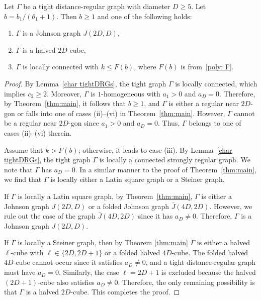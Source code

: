 \begin{theorem}\label{tight corollary}
Let $\Gamma$ be a tight distance-regular graph with diameter $D \geqslant 5$. Let $b=b_1/(\theta_1 +1)$. Then $b \geqslant 1$ and one of the following holds:
\begin{enumerate}[\normalfont(i)]
  \item $\Gamma$ is a Johnson graph $J(2D,D)$,
  \item $\Gamma$ is a halved $2D$-cube,
  \item $\Gamma$ is locally connected with $k \leqslant F(b)$, where $F(b)$ is from~\eqref{poly: F}.
\end{enumerate}
\end{theorem}
\begin{proof}
By Lemma~\ref{char tightDRGs}, the tight graph $\Gamma$ is locally connected, which implies $c_2\geqslant 2$.
Moreover, $\Gamma$ is $1$-homogeneous with $a_1 > 0$ and $a_D=0$.
Therefore, by Theorem~\ref{thm:main}, it follows that $b\geqslant 1$, and $\Gamma$ is either a regular near $2D$-gon or falls into one of cases (ii)--(vi) in Theorem~\ref{thm:main}.
However, $\Gamma$ cannot be a regular near $2D$-gon since $a_1 > 0$ and $a_D=0$.
Thus, $\Gamma$ belongs to one of cases (ii)--(vi) therein.

Assume that $k > F(b)$; otherwise, it leads to case (iii).
By Lemma~\ref{char tightDRGs}, the tight graph $\Gamma$ is locally a connected strongly regular graph.
We note that $\Gamma$ has $a_D=0$.
In a similar manner to the proof of Theorem~\ref{thm:main}, we find that $\Gamma$ is locally either a Latin square graph or a Steiner graph.

If $\Gamma$ is locally a Latin square graph, by Theorem~\ref{thm:main}, $\Gamma$ is either a Johnson graph $J(2D,D)$ or a folded Johnson graph $\bar{J}(4D,2D)$. 
However, we rule out the case of the graph $\bar{J}(4D,2D)$ since it has $a_D\ne 0$. 
Therefore, $\Gamma$ is a Johnson graph $J(2D,D)$.

If $\Gamma$ is locally a Steiner graph, then by Theorem \ref{thm:main} $\Gamma$ is either a halved $\ell$-cube with $\ell \in \{2D,2D+1\}$ or a folded halved $4D$-cube. The folded halved $4D$-cube cannot occur since it satisfies $a_D \ne 0$, and a tight distance-regular graph must have $a_D = 0$. Similarly, the case $\ell = 2D+1$ is excluded because the halved $(2D+1)$-cube also satisfies $a_D \ne 0$. Therefore, the only remaining possibility is that $\Gamma$ is a halved $2D$-cube. This completes the proof.
\end{proof}

